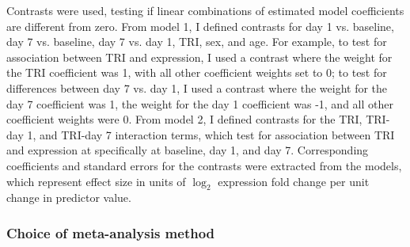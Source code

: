 Contrasts were used, testing if linear combinations of estimated model coefficients are different from zero.
%
From model 1, I defined contrasts for day 1 vs. baseline, day 7 vs. baseline, day 7 vs. day 1, \gls{TRI}, sex, and age.
For example, 
to test for association between \gls{TRI} and expression, 
    I used a contrast where
    the weight for the \gls{TRI} coefficient was 1,
    with all other coefficient weights set to 0;
to test for differences between day 7 vs. day 1,
    I used a contrast where
    the weight for the day 7 coefficient was 1,
    the weight for the day 1 coefficient was -1,
    and all other coefficient weights were 0.
From model 2, I defined contrasts for the \gls{TRI}, \gls{TRI}-day 1, and \gls{TRI}-day 7 interaction terms,
    which test for association between \gls{TRI} and expression at specifically at baseline, day 1, and day 7.
%
Corresponding coefficients and standard errors for the contrasts were extracted from the  models, 
which represent effect size in units of $\log_2$ expression fold change per unit change in predictor value.

\subsubsection{Choice of  meta-analysis method}
\label{subsubsec:hird_dge_meta_methodChoice}

